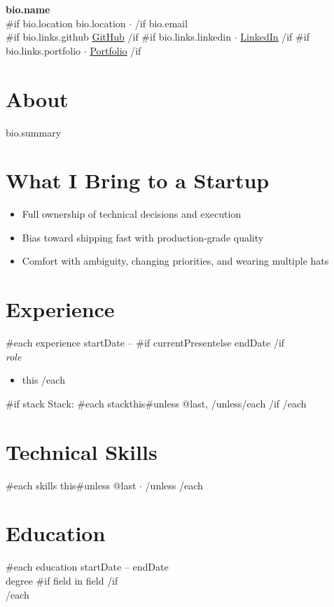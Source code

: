 \documentclass[11pt,a4paper]{article}
\begin{document}
\begin{center}
    {\Huge \bfseries {{ bio.name }} } \\[6pt]
    {\color{muted} {{#if bio.location}}{{ bio.location }} $\cdot$ {{/if}} {{ bio.email }} } \\[4pt]
    {{#if bio.links.github}} \href{ {{ bio.links.github }} }{GitHub} {{/if}}
    {{#if bio.links.linkedin}} $\cdot$ \href{ {{ bio.links.linkedin }} }{LinkedIn} {{/if}}
    {{#if bio.links.portfolio}} $\cdot$ \href{ {{ bio.links.portfolio }} }{Portfolio} {{/if}}
\end{center}

\vspace{4pt}

\section*{About}
{{bio.summary}}

\section*{What I Bring to a Startup}
\begin{itemize}[noitemsep,topsep=0pt]
    \item Full ownership of technical decisions and execution
    \item Bias toward shipping fast with production-grade quality
    \item Comfort with ambiguity, changing priorities, and wearing multiple hats
\end{itemize}

\section*{Experience}
{{#each experience}}
 \hfill {\color{muted} {{ startDate }} -- {{#if current}}Present{{else}}{{ endDate }}{{/if}}} \\
{\itshape {{ role }} } \\
\begin{itemize}[noitemsep,topsep=0pt]
    {{#each highlights}}
    \item {{ this }}
    {{/each}}
\end{itemize}
{{#if stack}}
{\small \color{muted} Stack: {{#each stack}}{{this}}{{#unless @last}}, {{/unless}}{{/each}} }
{{/if}}
\vspace{8pt}
{{/each}}

\section*{Technical Skills}
{{#each skills}}
{{this}}{{#unless @last}} $\cdot$ {{/unless}}
{{/each}}

\section*{Education}
{{#each education}}
 \hfill {\color{muted} {{ startDate }} -- {{ endDate }}} \\
{{ degree }}{{#if field}} in {{ field }}{{/if}} \\
\vspace{4pt}
{{/each}}
\end{document}
